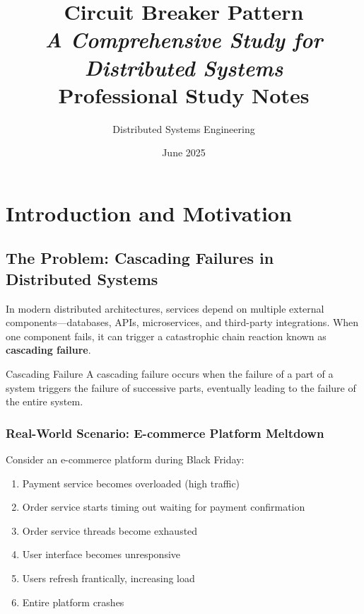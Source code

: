 \documentclass[12pt,a4paper]{article}
\title{\Huge \textbf{Circuit Breaker Pattern} \\
       \Large \textit{A Comprehensive Study for Distributed Systems} \\
       \vspace{0.5cm}
       \normalsize Professional Study Notes}
\author{Distributed Systems Engineering}
\date{June 2025}
\begin{document}
\maketitle
\newpage

\tableofcontents
\newpage

\section{Introduction and Motivation}

\subsection{The Problem: Cascading Failures in Distributed Systems}

In modern distributed architectures, services depend on multiple external components—databases, APIs, microservices, and third-party integrations. When one component fails, it can trigger a catastrophic chain reaction known as \textbf{cascading failure}.

\begin{definitionbox}{Cascading Failure}
A cascading failure occurs when the failure of a part of a system triggers the failure of successive parts, eventually leading to the failure of the entire system.
\end{definitionbox}

\subsubsection{Real-World Scenario: E-commerce Platform Meltdown}

Consider an e-commerce platform during Black Friday:

\begin{enumerate}
    \item Payment service becomes overloaded (high traffic)
    \item Order service starts timing out waiting for payment confirmation
    \item Order service threads become exhausted
    \item User interface becomes unresponsive
    \item Users refresh frantically, increasing load
    \item Entire platform crashes
\end{enumerate}
\end{document}
